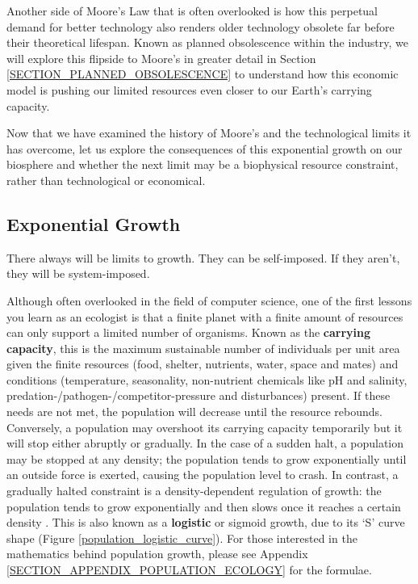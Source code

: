 \documentclass{article}
\begin{document}
Another side of Moore's Law that is often overlooked is how this perpetual demand for better technology also renders older technology obsolete far before their theoretical lifespan. Known as planned obsolescence within the industry, we will explore this flipside to Moore's in greater detail in Section \ref{SECTION_PLANNED_OBSOLESCENCE} to understand how this economic model is pushing our limited resources even closer to our Earth's carrying capacity.

Now that we have examined the history of Moore's and the technological limits it has overcome, let us explore the consequences of this exponential growth on our biosphere and whether the next limit may be a biophysical resource constraint, rather than technological or economical.

\subsection{Exponential Growth}
 \begin{fquote} 
 There always will be limits to growth. They can be self-imposed. If they aren’t, they will be system-imposed.
 \end{fquote}
 
Although often overlooked in the field of computer science, one of the first lessons you learn as an ecologist is that a finite planet with a finite amount of resources can only support a limited number of organisms. Known as the \textbf{carrying capacity}, this is the maximum sustainable number of individuals per unit area given the finite resources (food, shelter, nutrients, water, space and mates) and conditions (temperature, seasonality, non-nutrient chemicals like pH and salinity, predation-/pathogen-/competitor-pressure and disturbances) present. If these needs are not met, the population will decrease until the resource rebounds. Conversely, a population may overshoot its carrying capacity temporarily but it will stop either abruptly or gradually. In the case of a sudden halt, a population may be stopped at any density; the population tends to grow exponentially until an outside force is exerted, causing the population level to crash. In contrast, a gradually halted constraint is a density-dependent regulation of growth: the population tends to grow exponentially and then slows once it reaches a certain density \cite{waynegoodey2014biology230}. This is also known as a \textbf{logistic} or sigmoid growth, due to its `S' curve shape (Figure \ref{population_logistic_curve}). For those interested in the mathematics behind population growth, please see Appendix \ref{SECTION_APPENDIX_POPULATION_ECOLOGY} for the formulae. 
\end{document}
